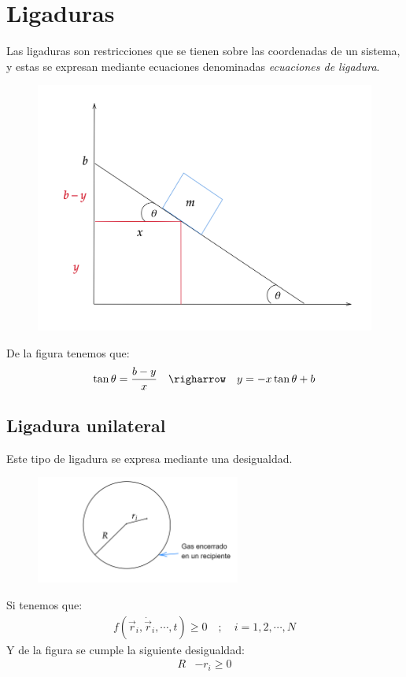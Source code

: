 \documentclass[../main]{subfiles}
\begin{document}
\section{Ligaduras}

Las ligaduras son restricciones que se tienen sobre las coordenadas de un sistema, y estas se expresan mediante ecuaciones denominadas \textit{ecuaciones de ligadura}.

    \begin{figure}[h]
        \centering
        \includegraphics[scale=0.1]{Física Clásica/MECA 2/images/lig1.png}
        \label{fig:fig2}
    \end{figure}
    De la figura tenemos que:
    \begin{align}
        \tan{\theta}=\dfrac{b-y}{x} \quad \righarrow \quad y=-x \tan{\theta}+b
        \label{eq40}
    \end{align}
\subsection*{Ligadura unilateral} 
Este tipo de ligadura se expresa mediante una desigualdad.

    \begin{figure}[h]
        \centering
        \includegraphics[width=0.6\textwidth]{Física Clásica/MECA 2/images/lig2.png}
        \label{fig:fig3}
    \end{figure}
    Si tenemos que: 
    \begin{align}
        f(\vec{r}_i, \dot{\vec{r}}_i, \cdots, t) \geq 0 \quad ; \quad i=1,2,\cdots,N 
    \end{align}
    Y de la figura se cumple la siguiente desigualdad:
    \begin{align}
        R&-r_i \geq 0
    \end{align}
\end{document}
